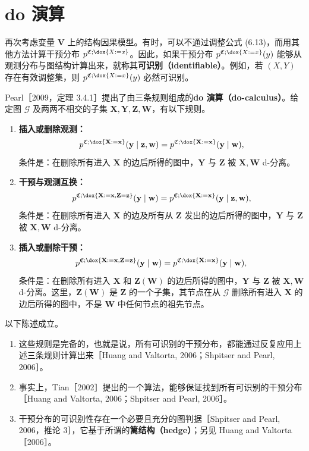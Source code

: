 \section{do 演算}
\label{sec:ch06-do-calculus}

再次考虑变量 $\mathbf V$ 上的结构因果模型。有时，可以不通过调整公式 (6.13)，而用其他方法计算干预分布 $p^{\mathfrak C;\dox{X:=x}}$。因此，如果干预分布 $p^{\mathfrak C;\dox{X:=x}}(y)$ 能够从观测分布与图结构计算出来，就称其\textbf{可识别（identifiable）}。例如，若 $(X,Y)$ 存在有效调整集，则 $p^{\mathfrak C;\dox{X:=x}}(y)$ 必然可识别。

Pearl［2009，定理 3.4.1］提出了由三条规则组成的\textbf{do 演算（do-calculus）}。给定图 $\mathcal G$ 及两两不相交的子集 $\mathbf X,\mathbf Y,\mathbf Z,\mathbf W$，有以下规则。
\begin{enumerate}[label=\arabic*.]
 \item \textbf{插入或删除观测：}
 \[
 p^{\mathfrak C;\dox{\mathbf X:=\mathbf x}}(\mathbf y\mid\mathbf z,\mathbf w)
 =p^{\mathfrak C;\dox{\mathbf X:=\mathbf x}}(\mathbf y\mid\mathbf w),
 \]
 条件是：在删除所有进入 $\mathbf X$ 的边后所得的图中，$\mathbf Y$ 与 $\mathbf Z$ 被 $\mathbf X,\mathbf W$ d-分离。
 \item \textbf{干预与观测互换：}
 \[
 p^{\mathfrak C;\dox{\mathbf X:=\mathbf x,\mathbf Z=\mathbf z}}(\mathbf y\mid\mathbf w)
 =p^{\mathfrak C;\dox{\mathbf X:=\mathbf x}}(\mathbf y\mid\mathbf z,\mathbf w),
 \]
 条件是：在删除所有进入 $\mathbf X$ 的边及所有从 $\mathbf Z$ 发出的边后所得的图中，$\mathbf Y$ 与 $\mathbf Z$ 被 $\mathbf X,\mathbf W$ d-分离。
 \item \textbf{插入或删除干预：}
 \[
 p^{\mathfrak C;\dox{\mathbf X:=\mathbf x,\mathbf Z=\mathbf z}}(\mathbf y\mid\mathbf w)
 =p^{\mathfrak C;\dox{\mathbf X:=\mathbf x}}(\mathbf y\mid\mathbf w),
 \]
 条件是：在删除所有进入 $\mathbf X$ 和 $\mathbf Z(\mathbf W)$ 的边后所得的图中，$\mathbf Y$ 与 $\mathbf Z$ 被 $\mathbf X,\mathbf W$ d-分离。这里，$\mathbf Z(\mathbf W)$ 是 $\mathbf Z$ 的一个子集，其节点在从 $\mathcal G$ 删除所有进入 $\mathbf X$ 的边后所得的图中，不是 $\mathbf W$ 中任何节点的祖先节点。
\end{enumerate}

\begin{theorem}[do 演算]
以下陈述成立。
\begin{enumerate}[label=(\roman*)]
 \item 这些规则是完备的，也就是说，所有可识别的干预分布，都能通过反复应用上述三条规则计算出来［Huang and Valtorta, 2006；Shpitser and Pearl, 2006］。
 \item 事实上，Tian［2002］提出的一个算法，能够保证找到所有可识别的干预分布［Huang and Valtorta, 2006；Shpitser and Pearl, 2006］。
 \item 干预分布的可识别性存在一个必要且充分的图判据［Shpitser and Pearl, 2006，推论 3］，它基于所谓的\textbf{篱结构（hedge）}；另见 Huang and Valtorta［2006］。
\end{enumerate}
\end{theorem}

